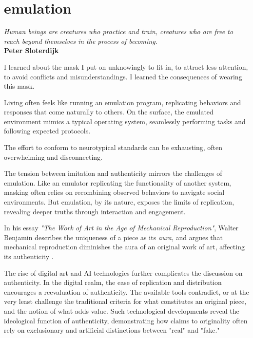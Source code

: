 \chapter*{emulation}
\begin{center}
\vspace{2cm}
\begin{flushright}
\large
\textit{Human beings are creatures who practice and train, creatures who are free to reach beyond themselves in the process of becoming.}\\
\textbf{Peter Sloterdijk} \citep{sloterdijk2014}
\end{flushright}
\vspace{2cm}
\end{center}
\normalsize

\newpage  %
I learned about the mask I put on unknowingly to fit in, to attract less attention, to avoid conflicts and misunderstandings. I learned the consequences of wearing this mask.

Living often feels like running an emulation program, replicating behaviors and responses that come naturally to others. On the surface, the emulated environment mimics a typical operating system, seamlessly performing tasks and following expected protocols. 

The effort to conform to neurotypical standards can be exhausting, often overwhelming and disconnecting.

The tension between imitation and authenticity mirrors the challenges of emulation. Like an emulator replicating the functionality of another system, masking often relies on recombining observed behaviors to navigate social environments. But emulation, by its nature, exposes the limits of replication, revealing deeper truths through interaction and engagement.

In his essay \textit{"The Work of Art in the Age of Mechanical Reproduction"}, Walter Benjamin describes the uniqueness of a piece as its \textit{aura}, and argues that mechanical reproduction diminishes the aura of an original work of art, affecting its authenticity \citep{benjamin1935}. 

The rise of digital art and AI technologies further complicates the discussion on authenticity. In the digital realm, the ease of replication and distribution encourages a reevaluation of authenticity. The available tools contradict, or at the very least challenge the traditional criteria for what constitutes an original piece, and the notion of what adds value. Such technological developments reveal the ideological function of authenticity, demonstrating how claims to originality often rely on exclusionary and artificial distinctions between "real" and "fake."

